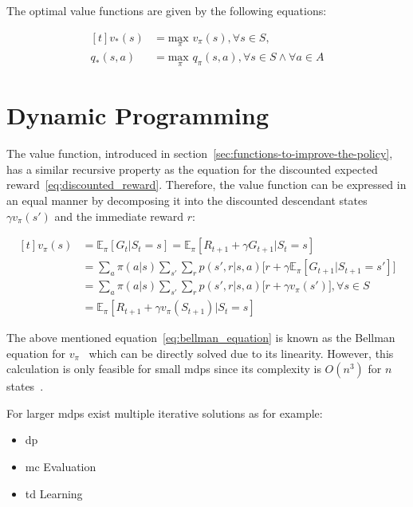 \documentclass[draft,final]{vutinfth} %
\begin{document}
    The optimal value functions are given by the following equations:

    \begin{equation}
        \begin{aligned}[t]
            v_*(s) &= \underset{\pi}{\text{max }}v_\pi(s), \forall s \in \mathit{S}, \\
            q_*(s,a) &= \underset{\pi}{\text{max }}q_\pi(s,a), \forall s \in \mathit{S} \land \forall a \in \mathit{A}\label{eq:optimal}
        \end{aligned}
    \end{equation}


    \section{Dynamic Programming}

    The value function, introduced in section~\ref{sec:functions-to-improve-the-policy}, has a similar recursive property as the equation for the discounted expected reward~\eqref{eq:discounted_reward}.
    Therefore, the value function can be expressed in an equal manner by decomposing it into the discounted descendant states $\gamma v_\pi(s')$ and the immediate reward $r$:

    \begin{equation}
        \begin{aligned}[t]
            v_\pi(s) &= \mathbb{E}_\pi[G_t|S_t=s] = \mathbb{E}_\pi[R_{t+1} + \gamma G_{t+1}|S_t=s] \\
            &  =  \sum_{a} \pi(a|s) \sum_{s'}\sum_{r} p(s',r|s,a) \bigg[r + \gamma \mathbb{E}_\pi[G_{t+1}|S_{t+1} = s'] \bigg] \\
            &  =  \sum_{a} \pi(a|s) \sum_{s'}\sum_{r} p(s',r|s,a) \bigg[r + \gamma v_{\pi}(s') \bigg], \forall s \in \mathit{S} \\
            &  =  \mathbb{E}_\pi[R_{t+1} + \gamma v_\pi(S_{t+1})|S_t=s]
            \label{eq:bellman_equation}
        \end{aligned}
    \end{equation}

    The above mentioned equation~\eqref{eq:bellman_equation} is known as the Bellman equation for $v_\pi$~\citep{sutton_reinforcement_2018} which can be directly solved due to its linearity.
    However, this calculation is only feasible for small \glspl{mdp} since its complexity is $O(n^3)$ for $n$ states~.

    For larger \glspl{mdp} exist multiple iterative solutions as for example:
    \begin{itemize}
        \item \gls{dp}
        \item \gls{mc} Evaluation
        \item \gls{td} Learning
    \end{itemize}
\end{document}
